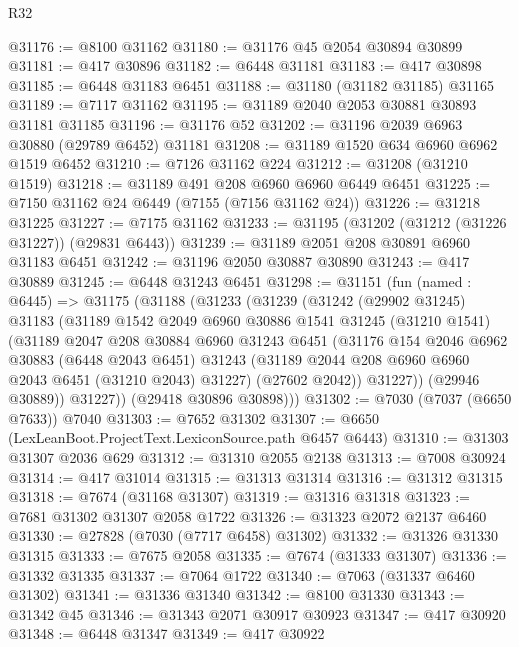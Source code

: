 \begin{lexlean}{R32}
\begin{coremodule}
@31176 := @8100 @31162
@31180 := @31176 @45 @2054 @30894 @30899
@31181 := @417 @30896
@31182 := @6448 @31181
@31183 := @417 @30898
@31185 := @6448 @31183 @6451
@31188 := @31180 (@31182 @31185) @31165
@31189 := @7117 @31162
@31195 := @31189 @2040 @2053 @30881 @30893 @31181 @31185
@31196 := @31176 @52
@31202 := @31196 @2039 @6963 @30880 (@29789 @6452) @31181
@31208 := @31189 @1520 @634 @6960 @6962 @1519 @6452
@31210 := @7126 @31162 @224
@31212 := @31208 (@31210 @1519)
@31218 := @31189 @491 @208 @6960 @6960 @6449 @6451
@31225 := @7150 @31162 @24 @6449 (@7155 (@7156 @31162 @24))
@31226 := @31218 @31225
@31227 := @7175 @31162
@31233 := @31195 (@31202 (@31212 (@31226 @31227)) (@29831 @6443))
@31239 := @31189 @2051 @208 @30891 @6960 @31183 @6451
@31242 := @31196 @2050 @30887 @30890
@31243 := @417 @30889
@31245 := @6448 @31243 @6451
@31298 := @31151
    (fun (named : @6445) =>
    @31175
      (@31188
        (@31233
          (@31239
            (@31242
              (@29902 @31245)
              @31183
              (@31189
                @1542
                @2049
                @6960
                @30886
                @1541
                @31245
                (@31210 @1541)
                (@31189
                  @2047
                  @208
                  @30884
                  @6960
                  @31243
                  @6451
                  (@31176
                    @154
                    @2046
                    @6962
                    @30883
                    (@6448 @2043 @6451)
                    @31243
                    (@31189 @2044 @208 @6960 @6960 @2043 @6451 (@31210 @2043) @31227)
                    (@27602 @2042))
                  @31227))
              (@29946 @30889))
            @31227))
        (@29418 @30896 @30898)))
@31302 := @7030 (@7037 (@6650 @7633)) @7040
@31303 := @7652 @31302
@31307 := @6650 (LexLeanBoot.ProjectText.LexiconSource.path @6457 @6443)
@31310 := @31303 @31307 @2036 @629
@31312 := @31310 @2055 @2138
@31313 := @7008 @30924
@31314 := @417 @31014
@31315 := @31313 @31314
@31316 := @31312 @31315
@31318 := @7674 (@31168 @31307)
@31319 := @31316 @31318
@31323 := @7681 @31302 @31307 @2058 @1722
@31326 := @31323 @2072 @2137 @6460
@31330 := @27828 (@7030 (@7717 @6458) @31302)
@31332 := @31326 @31330 @31315
@31333 := @7675 @2058
@31335 := @7674 (@31333 @31307)
@31336 := @31332 @31335
@31337 := @7064 @1722
@31340 := @7063 (@31337 @6460 @31302)
@31341 := @31336 @31340
@31342 := @8100 @31330
@31343 := @31342 @45
@31346 := @31343 @2071 @30917 @30923
@31347 := @417 @30920
@31348 := @6448 @31347
@31349 := @417 @30922

\end{coremodule}
\end{lexlean}
